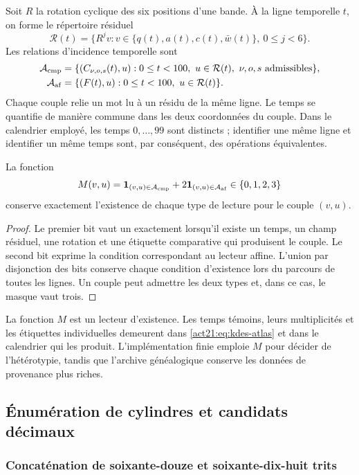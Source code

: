 Soit $R$ la rotation cyclique des six positions d'une bande. À la
ligne temporelle $t$, on forme le répertoire résiduel
\[
 \mathcal R(t)=\{R^jv:
      v\in\{q(t),a(t),c(t),\bar w(t)\},\ 0\leq j<6\}.
\]
Les relations d'incidence temporelle sont
\begin{align}
 \mathcal A_{\rm cmp}
 &=\{(C_{\nu,o,s}(t),u):
      0\leq t<100,\ u\in\mathcal R(t),\ \nu,o,s\text{ admissibles}\},\\
 \mathcal A_{\rm af}
 &=\{(F(t),u):0\leq t<100,\ u\in\mathcal R(t)\}.
 \label{act21:eq:kdes-atlas}
\end{align}
Chaque couple relie un mot lu à un résidu de la même ligne.
Le temps se quantifie de manière commune dans les deux coordonnées du couple.
Dans le calendrier employé, les temps $0,\ldots,99$ sont distincts ;
identifier une même ligne et identifier un même temps sont, par conséquent,
des opérations équivalentes.

\begin{proposition}
La fonction
\[
 M(v,u)=\mathbf1_{(v,u)\in\mathcal A_{\rm cmp}}
        +2\mathbf1_{(v,u)\in\mathcal A_{\rm af}}
        \in\{0,1,2,3\}
\]
conserve exactement l'existence de chaque type de lecture pour le couple  
$(v,u)$.
\end{proposition}
\begin{proof}
Le premier bit vaut un exactement lorsqu'il existe un temps, un champ
résiduel, une rotation et une étiquette comparative qui produisent le couple.
Le second bit exprime la condition correspondant au lecteur affine.
L'union par disjonction des bits conserve chaque condition d'existence
lors du parcours de toutes les lignes. Un couple peut admettre les deux types et, dans ce
cas, le masque vaut trois.
\end{proof}

La fonction $M$ est un lecteur d'existence. Les temps témoins, leurs multiplicités et les étiquettes individuelles demeurent dans \eqref{act21:eq:kdes-atlas} et dans le calendrier qui les produit. L'implémentation finie emploie $M$ pour décider de l'hétérotypie, tandis que l'archive généalogique conserve les données de provenance plus riches.

\subsection{Énumération de cylindres et candidats décimaux}

\subsubsection{Concaténation de soixante-douze et soixante-dix-huit trits}


